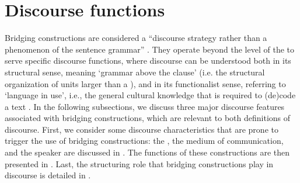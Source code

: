 \documentclass[output=paper]{LSP/langsci}
\begin{document}
\section{Discourse functions} 
\label{GuAi4discourse}
Bridging constructions are considered a ``discourse strategy rather than a phenomenon of the sentence grammar'' \citep[][364]{devries.2005}. They operate beyond the level of the  to serve specific discourse functions, where discourse can be understood both in its structural sense, meaning `grammar above the clause' (i.e. the structural organization of units larger than a ), and in its functionalist sense, referring to `language in use', i.e., the general cultural knowledge that is required to (de)code a text \citep[][10--13]{cameron01}. In the following subsections, we discuss three major discourse features associated with bridging constructions, which are relevant to both definitions of discourse. First, we consider some discourse characteristics that are prone to trigger the use of bridging constructions: the , the medium of communication, and the speaker are discussed in . The  functions of these constructions are then presented in . Last, the structuring role that bridging constructions play in discourse is detailed in . 
\end{document}
